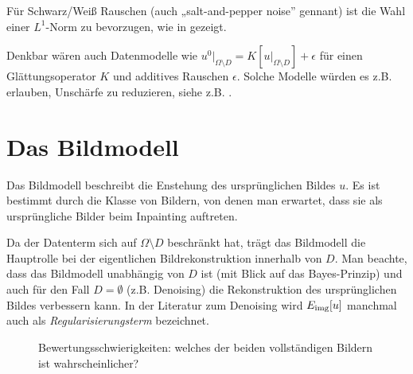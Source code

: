 \documentclass{mythesis}
\begin{document}
Für Schwarz/Weiß Rauschen (auch „salt-and-pepper noise” gennant) ist die Wahl einer $L^1$-Norm zu bevorzugen, wie in \cite{nikolova2004variational} gezeigt.

Denkbar wären auch Datenmodelle wie $u^0|_{\Omega\setminus D} = K[u|_{\Omega\setminus D}] + \epsilon$ für einen Glättungsoperator $K$ und additives Rauschen $\epsilon$.
Solche Modelle würden es z.B. erlauben, Unschärfe zu reduzieren, siehe z.B. \cite{rudin1994total}.


\section{Das Bildmodell}

Das Bildmodell beschreibt die Enstehung des ursprünglichen Bildes $u$.
Es ist bestimmt durch die Klasse von Bildern, von denen man erwartet, dass sie als ursprüngliche Bilder beim Inpainting auftreten.

Da der Datenterm sich auf $\Omega \setminus D$ beschränkt hat, trägt das Bildmodell die Hauptrolle bei der eigentlichen Bildrekonstruktion innerhalb von $D$.
Man beachte, dass das Bildmodell unabhängig von $D$ ist (mit Blick auf das Bayes-Prinzip) und auch für den Fall $D = \emptyset$ (z.B. Denoising) die Rekonstruktion des ursprünglichen Bildes verbessern kann.
In der Literatur zum Denoising wird $E_{\mathrm{img}}[u]$ manchmal auch als \emph{Regularisierungsterm} bezeichnet.

\begin{figure}[ht]
    \begin{subfigure}[b]{0.33\textwidth}
	\centering
    \end{subfigure}%
    \begin{subfigure}[b]{0.33\textwidth}
	\centering
    \end{subfigure}%
    \begin{subfigure}[b]{0.33\textwidth}
	\centering
    \end{subfigure}
    \caption{Bewertungsschwierigkeiten: welches der beiden vollständigen Bildern ist wahrscheinlicher?}
    \label{fig:inpainting_non_unique}
\end{figure}
\end{document}
